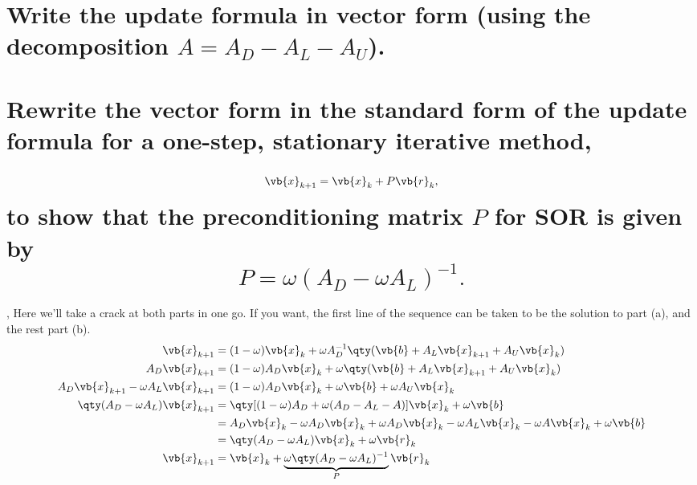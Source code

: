 \documentclass[boxes,pages]{homework}
\begin{document}
\begin{problem}
\begin{parts}
	\part{Write the update formula in vector form (using the decomposition $A = A_D - A_L - A_U$).}\label{part:2a}
	\part{Rewrite the vector form in the standard form of the update formula for a one-step, stationary iterative method, \[\vb{x}_{k+1} = \vb{x}_k + P\vb{r}_k,\] to show that the preconditioning matrix $P$ for SOR is given by \[P = \omega(A_D - \omega A_L)^{-1}.\]}\label{part:2b}
\end{parts}
\end{problem}

\begin{solution}
	\ref{part:2a},\ref{part:2b}
	Here we'll take a crack at both parts in one go. If you want, the first line of the sequence can be taken to be the solution to part (a), and the rest part (b).
	\begin{align*}
		\vb{x}_{k+1}                             & = (1 - \omega)\vb{x}_k + \omega A_D^{-1}\qty(\vb{b} + A_L\vb{x}_{k+1} + A_U\vb{x}_k)                           \\
		A_D\vb{x}_{k+1}                          & = (1 - \omega)A_D\vb{x}_{k} + \omega\qty(\vb{b} + A_L\vb{x}_{k+1} + A_U\vb{x}_k)                               \\
		A_D\vb{x}_{k+1} - \omega A_L\vb{x}_{k+1} & = (1 - \omega)A_D\vb{x}_{k} + \omega\vb{b} + \omega A_U\vb{x}_k                                                \\
		\qty(A_D - \omega A_L)\vb{x}_{k+1}       & =\qty[(1 - \omega)A_D + \omega(A_D - A_L - A)]\vb{x}_k + \omega\vb{b}                                          \\
		                                         & = A_D\vb{x}_k - \omega A_D\vb{x}_k + \omega A_D\vb{x}_k - \omega A_L\vb{x}_k - \omega A\vb{x}_k + \omega\vb{b} \\
		                                         & = \qty(A_D - \omega A_L)\vb{x}_k + \omega\vb{r}_k                                                              \\
		\vb{x}_{k + 1}                           & = \vb{x}_k + \underbrace{\omega\qty(A_D - \omega A_L)^{-1}}_P\vb{r}_k
	\end{align*}
\end{solution}
\end{document}
